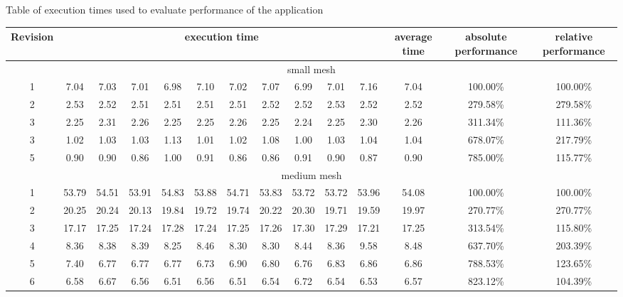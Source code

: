 \documentclass[conference]{IEEEtran}
\begin{document}
\begin{sidewaystable}
\centering
Table of execution times used to evaluate performance of the application\\[10pt]
\begin{tabular}{ |c|c|c|c|c|c|c|c|c|c|c|c|c|c| }
  \hline
  Revision & \multicolumn{10}{|c|}{execution time} & average time & absolute performance & relative performance \\
  \hline \hline
  \multicolumn{14}{|c|}{small mesh} \\ \hline
1 & 7.04 &  7.03 &  7.01 &  6.98 &  7.10 &  7.02 &  7.07 &  6.99 &  7.01 &  7.16 &  7.04 &  100.00\% & 100.00\% \\ \hline
2 & 2.53 &  2.52 &  2.51 &  2.51 &  2.51 &  2.51 &  2.52 &  2.52 &  2.53 &  2.52 &  2.52 &  279.58\% & 279.58\% \\ \hline
3 & 2.25 &  2.31 &  2.26 &  2.25 &  2.25 &  2.26 &  2.25 &  2.24 &  2.25 &  2.30 &  2.26 &  311.34\% & 111.36\% \\ \hline
3 & 1.02 &  1.03 &  1.03 &  1.13 &  1.01 &  1.02 &  1.08 &  1.00 &  1.03 &  1.04 &  1.04 &  678.07\% & 217.79\% \\ \hline
5 & 0.90 &  0.90 &  0.86 &  1.00 &  0.91 &  0.86 &  0.86 &  0.91 &  0.90 &  0.87 &  0.90 &  785.00\% & 115.77\% \\ \hline
\hline
\multicolumn{14}{|c|}{medium mesh} \\ \hline
1 & 53.79 & 54.51 & 53.91 & 54.83 & 53.88 & 54.71 & 53.83 & 53.72 & 53.72 & 53.96 & 54.08 & 100.00\% & 100.00\% \\ \hline
2 & 20.25 & 20.24 & 20.13 & 19.84 & 19.72 & 19.74 & 20.22 & 20.30 & 19.71 & 19.59 & 19.97 & 270.77\% & 270.77\% \\ \hline
3 & 17.17 & 17.25 & 17.24 & 17.28 & 17.24 & 17.25 & 17.26 & 17.30 & 17.29 & 17.21 & 17.25 & 313.54\% & 115.80\% \\ \hline
4 & 8.36 &  8.38 &  8.39 &  8.25 &  8.46 &  8.30 &  8.30 &  8.44 &  8.36 &  9.58 &  8.48 & 637.70\% & 203.39\% \\ \hline
5 & 7.40 &  6.77 &  6.77 &  6.77 &  6.73 &  6.90 &  6.80 &  6.76 &  6.83 &  6.86 &  6.86 & 788.53\% & 123.65\% \\ \hline
6 & 6.58 &  6.67 & 6.56 & 6.51 & 6.56 & 6.51 & 6.54 & 6.72 & 6.54 & 6.53 & 6.57 & 823.12\% & 104.39\% \\ \hline
\end{tabular}
\end{sidewaystable}
\end{document}
